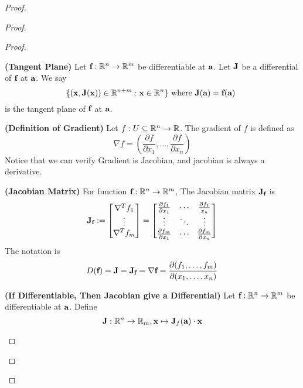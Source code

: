 \documentclass{report}
\begin{document}
\begin{proof}
\begin{proof}
\begin{proof}
\begin{definition}
\label{6.2.4}
\textbf{(Tangent Plane)} Let $\textbf{f}:\mathbb{R}^n\rightarrow \mathbb{R}^m$ be differentiable at $\textbf{a}$. Let $\textbf{J}$ be a differential of $\textbf{f}$ at $\textbf{a}$. We say
\begin{equation}
\{ (\textbf{x},\textbf{J}(\textbf{x}))\in\mathbb{R}^{n+m}:\textbf{x}\in\mathbb{R}^n \}\text{ where $\textbf{J}(\textbf{a})=\textbf{f}(\textbf{a})$ }
\end{equation}
is the tangent plane of $\textbf{f}$ at $\textbf{a}$.
\end{definition}
\begin{definition}
\label{6.2.5}
\textbf{(Definition of Gradient)}  Let $f:U\subseteq \mathbb{R}^n \rightarrow \mathbb{R}$. The gradient of $f$ is defined as
\begin{equation}
  \nabla f=(\frac{\partial f}{\partial x_1},\dots ,\frac{\partial f}{\partial x_n})
\end{equation}
Notice that we can verify Gradient is Jacobian, and jacobian is always a derivative. 
\end{definition}

\begin{definition}
\label{6.2.6}
\textbf{(Jacobian Matrix)} For function $\textbf{f}:\mathbb{R}^n\rightarrow \mathbb{R}^m$, The Jacobian matrix  $\textbf{J}_{\textbf{f}}$ is  
\begin{equation}
  \textbf{J}_{\textbf{f}}:=\begin{bmatrix}
\nabla ^T f_{1}\\
\vdots\\
\nabla^T f_m
    \end{bmatrix}=\begin{bmatrix}
    \frac{\partial f_1}{\partial x_1}&\cdots & \frac{\partial f_1}{x_n}\\
    \vdots & \ddots & \vdots\\
    \frac{\partial f_m}{\partial x_1} & \cdots & \frac{\partial f_m}{\partial x_n}
    \end{bmatrix}
\end{equation}
The notation is
\begin{equation}
  D(\textbf{f})=\textbf{J}=\textbf{J}_{\textbf{f}}=\nabla \textbf{f}=\frac{\partial (f_1,\dots, f_m)}{\partial  (x_1,\dots,x_n)}
\end{equation}
\end{definition}

\begin{theorem}
\label{6.2.7}
\textbf{(If Differentiable, Then Jacobian give a Differential)}
Let $\textbf{f}:\mathbb{R}^n\rightarrow \mathbb{R}^m$ be differentiable at $\textbf{a}$. Define
\begin{equation}
 \textbf{J}:\mathbb{R}^n\rightarrow \mathbb{R}_m, \textbf{x}\mapsto \textbf{J}_f(\textbf{a})\cdot \textbf{x}
\end{equation}


\end{theorem}
\end{proof}
\end{proof}
\end{proof}
\end{document}
